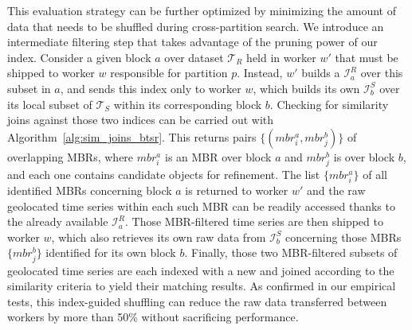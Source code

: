 This evaluation strategy can be further optimized by minimizing the amount of data that needs to be shuffled during cross-partition search. We introduce an intermediate filtering step that takes advantage of the pruning power of our \btsr index. Consider a given block $a$ over dataset $\mathcal{T}_{R}$ held in worker $w'$ that must be shipped to worker $w$ responsible for partition $p$. Instead, $w'$ builds a \btsr $\mathcal{I}_{a}^{R}$ over this subset in $a$, and sends this index only to worker $w$, which builds its own \btsr $\mathcal{I}_{b}^{S}$ over its local subset of $\mathcal{T}_{S}$ within its corresponding block $b$. Checking for similarity joins against those two indices can be carried out with Algorithm~\ref{alg:sim_joins_btsr}. This returns pairs $\{ (mbr^{a}_{i}, mbr^{b}_{j}) \}$ of overlapping MBRs, where $mbr^{a}_{i}$ is an MBR over block $a$ and $mbr^{b}_{j}$ is over block $b$, and each one contains candidate objects for refinement. The list $\{ mbr^{a}_{i} \}$ of all identified  MBRs concerning block $a$ is returned to worker $w'$ and the raw geolocated time series within each such MBR can be readily accessed thanks to the already available \btsr $\mathcal{I}_{a}^{R}$. Those MBR-filtered time series are then shipped to worker $w$, which also retrieves its own raw data from \btsr $\mathcal{I}_{b}^{S}$ concerning those MBRs $\{ mbr^{b}_{j} \}$ identified for its own block $b$. Finally, those two MBR-filtered subsets of geolocated time series are each indexed with a new {\btsr} and joined according to the similarity criteria to yield their matching results. As confirmed in our empirical tests, this index-guided shuffling can reduce the raw data transferred between workers by more than 50\% without sacrificing performance.